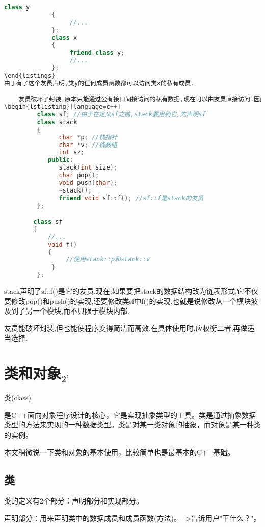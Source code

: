 \documentclass{article}
\begin{document}
\begin{lstlisting}[language=c++]
             class y
             {
                  //...
             };
             class x
             {
                  friend class y;
                  //...
             };
\end{listings}
由于有了这个友员声明,类y的任何成员函数都可以访问类x的私有成员.

    友员破坏了封装,原本只能通过公有接口间接访问的私有数据,现在可以由友员直接访问.因此,友员要了解它所访问的类的实现细节，当此类的实现有所改动，即使公共接口不改变，友员也要跟着改动。声明有友员的类是难修改的,例如:
\begin{lstlisting}[language=c++]
         class sf; //由于在定义sf之前,stack要用到它,先声明sf
         class stack
         {
               char *p; //栈指针
               char *v; //栈数组
               int sz;
            public:
               stack(int size);
               char pop();
               void push(char);
               ~stack();
               friend void sf::f(); //sf::f是stack的友员
         };

        class sf
        {
            //...
            void f()
            {
                 //使用stack::p和stack::v
             }
         };
\end{lstlisting}
stack声明了sf::f()是它的友员.现在,如果要把stack的数据结构改为链表形式,它不仅要修改pop()和push()的实现,还要修改类sf中f()的实现.也就是说修改从一个模块波及到了另一个模块,而不只限于模块内部.

友员能破坏封装,但也能使程序变得简洁而高效.在具体使用时,应权衡二者,再做适当选择.

\section{类和对象$_{\text{2'}}$}
\label{sec-3}

类(class)

是C++面向对象程序设计的核心，它是实现抽象类型的工具。类是通过抽象数据类型的方法来实现的一种数据类型。类是对某一类对象的抽象，而对象是某一种类的实例。

本文稍微说一下类和对象的基本使用，比较简单也是最基本的C++基础。

\subsection{类}
\label{sec-3-1}
类的定义有2个部分：声明部分和实现部分。

声明部分：用来声明类中的数据成员和成员函数(方法)。 ->告诉用户"干什么？"。
\end{document}
